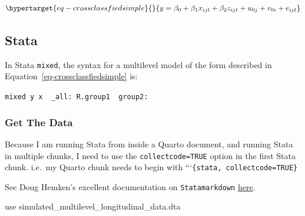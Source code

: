 \documentclass[
  letterpaper,
  DIV=11,
  numbers=noendperiod,
  oneside]{scrreprt}
\newenvironment{Shaded}{\begin{snugshade}}{\end{snugshade}}
\newcommand{\KeywordTok}[1]{\textcolor[rgb]{0.00,0.23,0.31}{#1}}
\newcommand{\NormalTok}[1]{\textcolor[rgb]{0.00,0.23,0.31}{#1}}
\begin{document}
\begin{equation}\protect\hypertarget{eq-crossclassfiedsimple}{}{y = \beta_0 + \beta_1 x_{ijt} + \beta_2 z_{ijt} + u_{0j} + v_{0i} + e_{ijt}}\label{eq-crossclassfiedsimple}\end{equation}

\subsection{Stata}

In Stata \texttt{mixed}, the syntax for a multilevel model of the form
described in Equation~\ref{eq-crossclassfiedsimple} is:

\texttt{mixed\ y\ x\ \textbar{}\textbar{}\ \_all:\ R.group1\ \textbar{}\textbar{}\ group2:}

\hypertarget{get-the-data-2}{%
\subsubsection{Get The Data}\label{get-the-data-2}}

\begin{tcolorbox}[enhanced jigsaw, arc=.35mm, coltitle=black, bottomtitle=1mm, colbacktitle=quarto-callout-tip-color!10!white, opacityback=0, colback=white, colframe=quarto-callout-tip-color-frame, opacitybacktitle=0.6, breakable, title=\textcolor{quarto-callout-tip-color}{\faLightbulb}\hspace{0.5em}{Tip For Running Stata From Quarto}, leftrule=.75mm, toptitle=1mm, bottomrule=.15mm, rightrule=.15mm, titlerule=0mm, toprule=.15mm, left=2mm]

Because I am running Stata from inside a Quarto document, and running
Stata in multiple chunks, I need to use the \texttt{collectcode=TRUE}
option in the first Stata chunk. i.e.~my Quarto chunk needs to begin
with ```\texttt{\{stata,\ collectcode=TRUE\}}

See Doug Hemken's excellent documentation on \texttt{Statamarkdown}
\href{https://www.ssc.wisc.edu/~hemken/Stataworkshops/Statamarkdown/linking-code-blocks.html\#linking-code-blocks-1}{here}.

\end{tcolorbox}

\begin{Shaded}
\begin{Highlighting}[]

\KeywordTok{use}\NormalTok{ simulated\_multilevel\_longitudinal\_data.dta}
\end{Highlighting}
\end{Shaded}
\end{document}
